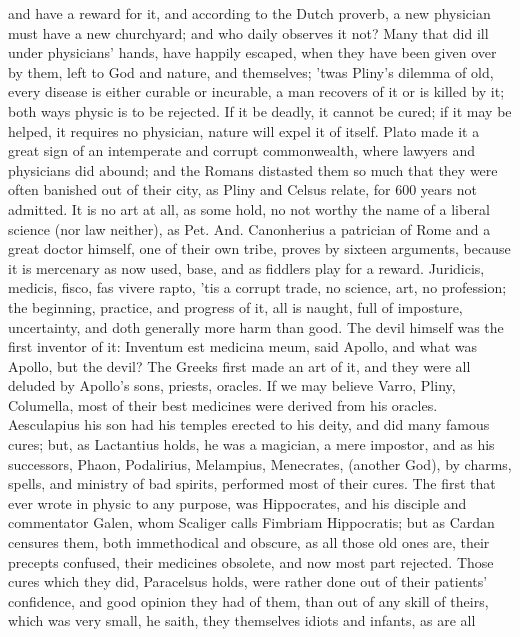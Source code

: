 {and have a reward for it, and according to the Dutch proverb, a new
physician must have a new churchyard; and who daily observes it not?
Many that did ill under physicians' hands, have happily escaped, when
they have been given over by them, left to God and nature, and
themselves; 'twas Pliny's dilemma of old, every disease is either
curable or incurable, a man recovers of it or is killed by it; both
ways physic is to be rejected. If it be deadly, it cannot be cured; if
it may be helped, it requires no physician, nature will expel it of
itself. Plato made it a great sign of an intemperate and corrupt
commonwealth, where lawyers and physicians did abound; and the Romans
distasted them so much that they were often banished out of their city,
as Pliny and Celsus relate, for 600 years not admitted. It is no art at
all, as some hold, no not worthy the name of a liberal science (nor law
neither), as Pet. And. Canonherius a patrician of Rome and a
great doctor himself, one of their own tribe, proves by sixteen
arguments, because it is mercenary as now used, base, and as fiddlers
play for a reward. Juridicis, medicis, fisco, fas vivere rapto, 'tis a
corrupt trade, no science, art, no profession; the beginning, practice,
and progress of it, all is naught, full of imposture, uncertainty, and
doth generally more harm than good. The devil himself was the first
inventor of it: Inventum est medicina meum, said Apollo, and what was
Apollo, but the devil? The Greeks first made an art of it, and they
were all deluded by Apollo's sons, priests, oracles. If we may believe
Varro, Pliny, Columella, most of their best medicines were derived from
his oracles. Aesculapius his son had his temples erected to his deity,
and did many famous cures; but, as Lactantius holds, he was a magician,
a mere impostor, and as his successors, Phaon, Podalirius, Melampius,
Menecrates, (another God), by charms, spells, and ministry of bad
spirits, performed most of their cures. The first that ever wrote in
physic to any purpose, was Hippocrates, and his disciple and
commentator Galen, whom Scaliger calls Fimbriam Hippocratis; but as
Cardan censures them, both immethodical and obscure, as all those
old ones are, their precepts confused, their medicines obsolete, and
now most part rejected. Those cures which they did, Paracelsus holds,
were rather done out of their patients' confidence, and good
opinion they had of them, than out of any skill of theirs, which was
very small, he saith, they themselves idiots and infants, as are all
}
